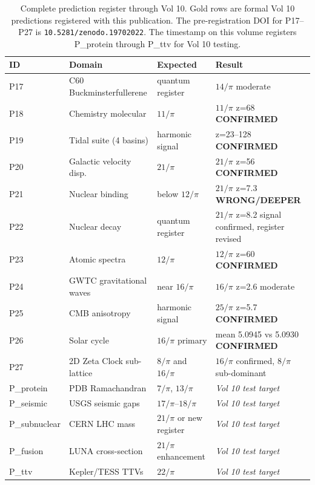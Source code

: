 \documentclass[11pt, letterpaper, openany]{book}
\begin{document}
\begin{table}[H]
\centering
\renewcommand{\arraystretch}{1.4}
\small
\begin{tabular}{|l|l|l|l|}
\hline
\rowcolor{kishblue!10}
\textbf{ID} & \textbf{Domain} & \textbf{Expected} & \textbf{Result} \\
\hline\hline
P17 & C60 Buckminsterfullerene & quantum register & $14/\pi$ moderate \\
P18 & Chemistry molecular       & $11/\pi$         & $11/\pi$ z=68 \textbf{CONFIRMED} \\
P19 & Tidal suite (4 basins)    & harmonic signal  & z=23--128 \textbf{CONFIRMED} \\
P20 & Galactic velocity disp.   & $21/\pi$         & $21/\pi$ z=56 \textbf{CONFIRMED} \\
P21 & Nuclear binding           & below $12/\pi$   & $21/\pi$ z=7.3 \textbf{WRONG/DEEPER} \\
P22 & Nuclear decay             & quantum register & $21/\pi$ z=8.2 signal confirmed, register revised \\
P23 & Atomic spectra            & $12/\pi$         & $12/\pi$ z=60 \textbf{CONFIRMED} \\
P24 & GWTC gravitational waves  & near $16/\pi$    & $16/\pi$ z=2.6 moderate \\
P25 & CMB anisotropy            & harmonic signal  & $25/\pi$ z=5.7 \textbf{CONFIRMED} \\
P26 & Solar cycle               & $16/\pi$ primary & mean 5.0945 vs 5.0930 \textbf{CONFIRMED} \\
P27 & 2D Zeta Clock sub-lattice & $8/\pi$ and $16/\pi$ & $16/\pi$ confirmed, $8/\pi$ sub-dominant \\
\hline
\rowcolor{newgold!8}
P\_protein & PDB Ramachandran   & $7/\pi$, $13/\pi$ & \textit{Vol 10 test target} \\
\rowcolor{newgold!8}
P\_seismic & USGS seismic gaps  & $17/\pi$--$18/\pi$ & \textit{Vol 10 test target} \\
\rowcolor{newgold!8}
P\_subnuclear & CERN LHC mass   & $21/\pi$ or new register & \textit{Vol 10 test target} \\
\rowcolor{newgold!8}
P\_fusion & LUNA cross-section  & $21/\pi$ enhancement & \textit{Vol 10 test target} \\
\rowcolor{newgold!8}
P\_ttv & Kepler/TESS TTVs       & $22/\pi$           & \textit{Vol 10 test target} \\
\hline
\end{tabular}
\caption{Complete prediction register through Vol 10. Gold rows are formal Vol 10
predictions registered with this publication. The pre-registration DOI for P17--P27
is \texttt{10.5281/zenodo.19702022}. The timestamp on this volume registers P\_protein
through P\_ttv for Vol 10 testing.}
\label{tab:full_prediction_register}
\end{table}
\end{document}
